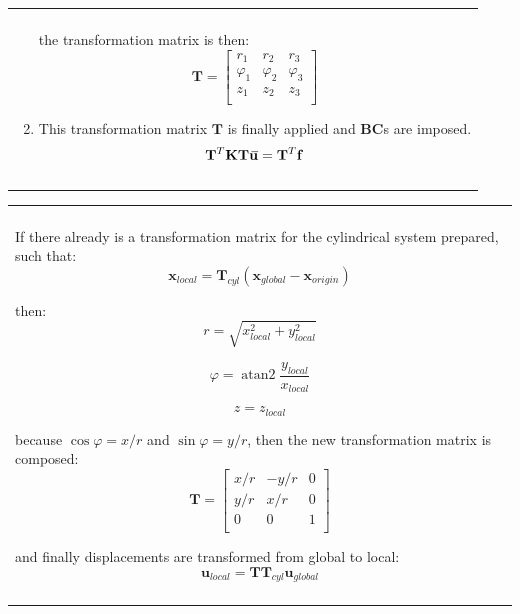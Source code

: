 \documentclass[10pt,b5paper,titlepage]{book}
\newcommand{\m}{\mathbf}
\DeclareMathOperator{\atantwo}{atan2}
\newcommand{\closure}[2][3]{%
{}\mkern#1mu\overline{\mkern-#1mu#2}}
\newenvironment{bbox}[1][0.96]
{
    \begin{center}
        \begin{tabular}{|p{#1\textwidth}|}
            \hline\\
}
{
            \\\\\hline
        \end{tabular}
    \end{center}
}
\begin{document}
\begin{bbox}
\begin{enumerate}
            the transformation matrix is then:
            \begin{equation}
                \m{T} = \begin{bmatrix}
                    r_1 & r_2 & r_3 \\
                    \varphi_1 & \varphi_2 & \varphi_3 \\
                    z_1 & z_2 & z_3 \\
                \end{bmatrix}
            \end{equation}

        \item This transformation matrix $ \m{T} $ is finally applied and
            \textbf{BC}s are imposed.
            \begin{equation}
                \m{T}^T \m{K} \m{T} \m{\closure{u}} = \m{T}^T \m{f}
            \end{equation}

    \end{enumerate}

\end{bbox}

\begin{bbox}
    If there already is a transformation matrix for the cylindrical system
    prepared, such that:
    \begin{equation}
        \m{x}_{local} = \m{T}_{cyl} \left( \m{x}_{global} - \m{x}_{origin} \right)
    \end{equation}

    then:
    \begin{equation}
        r = \sqrt{x_{local}^2 + y_{local}^2}
    \end{equation}

    \begin{equation}
        \varphi = \atantwo \frac{y_{local}}{x_{local}}
    \end{equation}

    \begin{equation}
        z = z_{local}
    \end{equation}

    because $ \cos \varphi = x / r $ and $ \sin \varphi = y / r $,
    then the new transformation matrix is composed:
    \begin{equation}
        \m{T} = \begin{bmatrix}
            x / r & -y/r & 0 \\
            y/r & x/r & 0 \\
            0 & 0 & 1 \\
        \end{bmatrix}
    \end{equation}

    and finally displacements are transformed from global to local:
    \begin{equation}
        \m{u}_{local} = \m{T} \m{T}_{cyl} \m{u}_{global}
    \end{equation}
\end{bbox}
\end{document}
